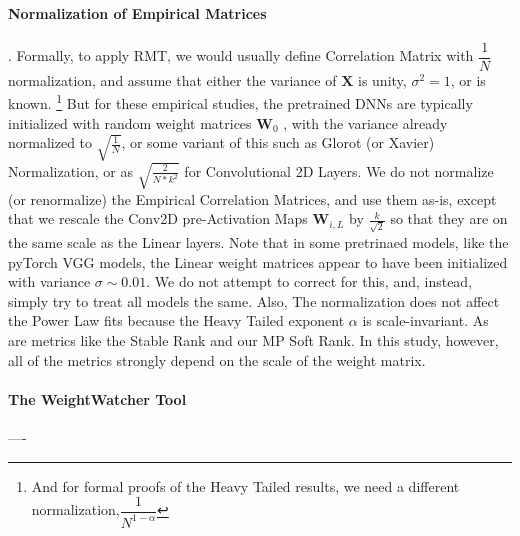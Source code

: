 \paragraph{Normalization of Empirical Matrices}.  Formally, to apply RMT, we would usually define Correlation Matrix with $\dfrac{1}{N}$ normalization,
and assume that either the variance of $\mathbf{X}$ is unity, $\sigma^{2}=1$, or is known.
\footnote{And for formal proofs of the Heavy Tailed results, we need a different normalization,$\dfrac{1}{N^{1-\alpha}}$}
But for these empirical studies, the pretrained DNNs are typically initialized with random weight matrices $\mathbf{W}_{0}$ ,
with the variance already normalized to $\sqrt{\frac{1}{N}}$, or some variant of this such as Glorot (or Xavier) Normalization\cite{GloRot},
or as $\sqrt{\frac{2}{N*k^2}}$ for Convolutional 2D Layers. 
We do not normalize (or renormalize) the Empirical Correlation Matrices, and use them as-is,
except that we rescale the Conv2D pre-Activation Maps $\mathbf{W}_{i,L}$ by $\frac{k}{\sqrt{2}}$ so that they
are on the same scale as the Linear layers.
Note that in some pretrinaed models, like the pyTorch VGG models, the Linear weight matrices appear to have been 
initialized with variance $\sigma\sim0.01$.  We do not attempt to correct for this, and, instead, simply try to treat all
models the same.  
Also, The normalization does not affect the Power Law fits because the Heavy Tailed exponent $\alpha$ is scale-invariant.
As are metrics like the Stable Rank and our MP Soft Rank. In this study, however, all of the metrics strongly depend 
on the scale of the weight matrix.


\paragraph{The WeightWatcher Tool}

----








